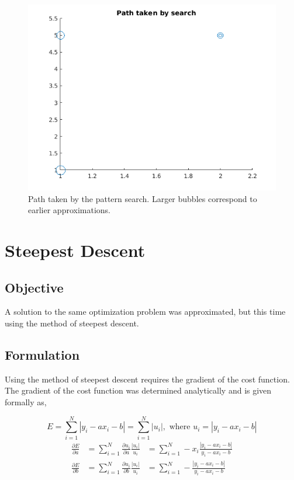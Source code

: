 \documentclass{article}
\begin{document}
\begin{figure}
	\centering
	\includegraphics[width=0.75\linewidth]{path-taken-by-search}
	\caption{Path taken by the pattern search. Larger bubbles correspond to earlier approximations.}
	\label{fig:path}
\end{figure}

\section{Steepest Descent}

\subsection{Objective}

A solution to the same optimization problem was approximated, but this time using the method of steepest descent.

\subsection{Formulation}

Using the method of steepest descent requires the gradient of the cost function.
The gradient of the cost function was determined analytically and is given formally as,

\begin{equation*}
E = \sum_{i=1}^{N} |y_i - ax_i - b| =  \sum_{i=1}^{N} |u_i|, \text{ where } u_i = |y_i - ax_i - b|
\end{equation*}
\begin{eqnarray*}
\frac{\partial E}{\partial a} &= \sum_{i=1}^{N} \frac{\partial u_i}{\partial a} \frac{|u_i|}{u_i} &=  \sum_{i=1}^{N} -x_i \frac{|y_i - ax_i - b|}{y_i - ax_i - b} \\
\frac{\partial E}{\partial b} &= \sum_{i=1}^{N} \frac{\partial u_i}{\partial b} \frac{|u_i|}{u_i} &=  \sum_{i=1}^{N} - \frac{|y_i - ax_i - b|}{y_i - ax_i - b} \\
\end{eqnarray*}
\end{document}
